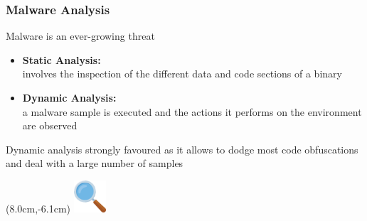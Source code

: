 \documentclass[compress]{beamer}
\begin{document}

\begin{frame}
    \frametitle{Malware Analysis}

	Malware is an ever-growing threat
	
    \medskip
    \begin{itemize}
        \item \textcolor{sapienza}{\textbf{Static Analysis:}}\\
        involves the inspection of the different data and code sections of a binary
        \item \textcolor{sapienza}{\textbf{Dynamic Analysis:}}\\
        a malware sample is executed and the actions it performs on the environment are observed
    \end{itemize}
    \vspace{0.5cm}    
        
         \begin{beamerboxesrounded}[shadow=true]{}
    Dynamic analysis strongly favoured as it allows to dodge most code obfuscations and deal with a large number of samples
    \end{beamerboxesrounded}    

    \begin{textblock*}{2cm}(8.0cm,-6.1cm)
   \includegraphics[width=1.2cm]{image/search.png}%
	\end{textblock*} 

\end{frame}
\end{document}

